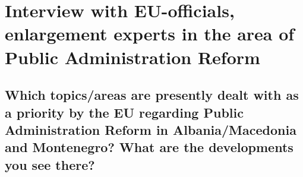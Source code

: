 
\chapter[Interview with EU-officials, enlargement experts]{Interview with EU-officials, enlargement experts in the area of Public Administration Reform}
\label{anhang:InterviewEuOfficials}
\section{Which topics/areas are presently dealt with as a priority by the EU regarding Public Administration Reform in Albania/Macedonia and Montenegro? What are the developments you see there? }
\label{sec:there}

